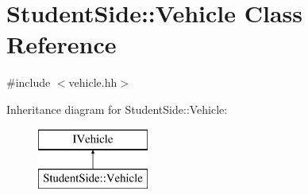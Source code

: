 \hypertarget{class_student_side_1_1_vehicle}{\section{Student\-Side\-:\-:Vehicle Class Reference}
\label{class_student_side_1_1_vehicle}
}


{\ttfamily \#include $<$vehicle.\-hh$>$}

Inheritance diagram for Student\-Side\-:\-:Vehicle\-:\begin{figure}[H]
\begin{center}
\leavevmode
\includegraphics[height=2.000000cm]{class_student_side_1_1_vehicle}
\end{center}
\end{figure}
